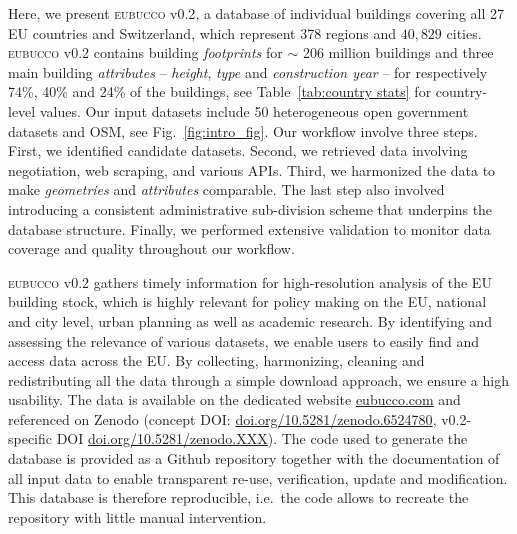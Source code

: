 \documentclass[fleqn,10pt]{wlscirep}
\begin{document}
Here, we present \textsc{eubucco} v0.2\cite{eubucco_v0.2_2022_dataset}, a database of individual buildings covering all 27 EU countries and Switzerland, which represent 378 regions and $40,829$ cities. \textsc{eubucco} v0.2 contains building \textit{footprints} for  $\sim$ 206 million buildings and three main building \textit{attributes} --  \textit{height}, \textit{type} and \textit{construction year} -- for respectively 74\%, 40\% and 24\% of the buildings, see Table~\ref{tab:country stats} for country-level values.
Our input datasets include 50 heterogeneous open government datasets and OSM, see Fig.~\ref{fig:intro_fig}. 
Our workflow involve three steps. First, we identified candidate datasets. Second, we retrieved data involving negotiation, web scraping, and various APIs. Third, we harmonized the data to make \textit{geometries} and \textit{attributes} comparable. The last step also involved introducing a consistent administrative sub-division scheme that underpins the database structure.
Finally, we performed extensive validation to monitor data coverage and quality throughout our workflow.

\textsc{eubucco} v0.2 gathers timely information for high-resolution analysis of the EU building stock, which is highly relevant for policy making on the EU, national and city level, urban planning as well as academic research. By identifying and assessing the relevance of various datasets, we enable users to easily find and access data across the EU. By collecting, harmonizing, cleaning and redistributing all the data through a simple download approach, we ensure a high usability. The data is available on the dedicated website \url{eubucco.com} and referenced on Zenodo\cite{eubucco_v0.2_2022_dataset} (concept DOI: \url{doi.org/10.5281/zenodo.6524780}, v0.2-specific DOI \url{doi.org/10.5281/zenodo.XXX}). The code used to generate the database is provided as a Github repository\cite{eubucco-0.2-code2022} together with the documentation of all input data to enable transparent re-use, verification, update and modification. This database is therefore reproducible, i.e.\ the code allows to recreate the repository with little manual intervention.
\end{document}
